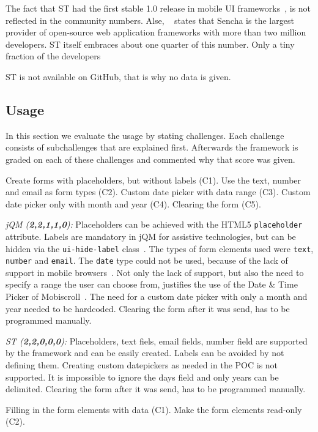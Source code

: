\documentclass[a4paper]{artikel3}
\newcommand{\code}[1]{\texttt{#1}}
\renewcommand{\paragraph}[1]{\vspace{2mm} \noindent {\bf #1}  }
\newcommand{\framework}[2]{ \emph{#1 (\textbf{#2}): }} %
\newcommand{\challenge}[1]{\paragraph{#1}}
\begin{document}
The fact that ST had the first stable 1.0 release in mobile UI frameworks~\cite{Oeflman2011},  is not reflected in the community numbers.  
Alse,  ~\cite{Inc.} states that Sencha is the largest provider of open-source web application frameworks with more than two million developers.  
ST itself embraces about one quarter of this number.  Only a tiny fraction of the developers 

ST is not available on GitHub,  that is why no data is given.

\subsection{Usage}
\label{sec:poc}
In this section we evaluate the usage by stating challenges.
Each challenge consists of subchallenges that are explained first.
Afterwards the framework is graded on each of these challenges and commented why that score was given.

\challenge{Forms (C1,C2,C3,C4,C5)}
Create forms with placeholders, but without labels (C1).
Use the text, number and email as form types (C2).
Custom date picker with data range (C3).
Custom date picker only with month and year (C4).
Clearing the form (C5).

\framework{jQM}{2,2,1,1,0}
Placeholders can be achieved with the HTML5 \code{placeholder} attribute.
Labels are mandatory in jQM for assistive technologies, but can be hidden via the \code{ui-hide-label} class~\cite{JQuery2013}. 
The types of form elements used were \code{text}, \code{number} and \code{email}. %
The \code{date} type could not be used, because of the lack of support in mobile browsers~\cite{Deveria2013b}.
Not only the lack of support, but also the need to specify a range the user can choose from, justifies the use of the Date \& Time Picker of Mobiscroll~\cite{Mobiscroll2013}.
The need for a custom date picker with only a month and year needed to be hardcoded.
Clearing the form after it was send, has to be programmed manually.

\framework{ST}{2,2,0,0,0}
Placeholders,  text fiels, email fields, number field are supported by the framework and can be easily created.  
Labels can be avoided by not defining them.  
Creating custom datepickers as needed in the POC is not supported.  
It is impossible to ignore the days field and only years can be delimited.  
Clearing the form after it was send, has to be programmed manually.

\challenge{Form filling (C1,C2,C3)}
Filling in the form elements with data (C1).
Make the form elements read-only (C2).
\end{document}

